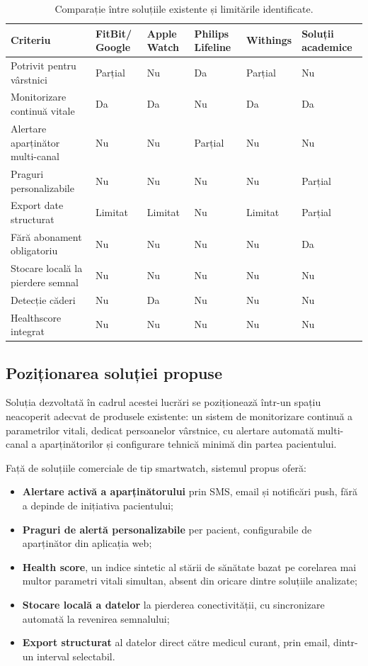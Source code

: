 \documentclass[12pt,a4paper]{article}
\begin{document}
\begin{table}[H]
\centering
\small
\renewcommand{\arraystretch}{1.3}
\begin{tabular}{|>{\raggedright\arraybackslash}p{3.0cm}|p{1.7cm}|p{1.7cm}|p{1.9cm}|p{1.5cm}|p{1.9cm}|}
\hline
\textbf{Criteriu} & \textbf{FitBit/ Google} & \textbf{Apple Watch} & \textbf{Philips Lifeline} & \textbf{Withings} & \textbf{Soluții academice}\\
\hline
Potrivit pentru vârstnici & Parțial & Nu & Da & Parțial & Nu\\
\hline
Monitorizare continuă vitale & Da & Da & Nu & Da & Da\\
\hline
Alertare aparținător multi-canal & Nu & Nu & Parțial & Nu & Nu\\
\hline
Praguri personalizabile & Nu & Nu & Nu & Nu & Parțial\\
\hline
Export date structurat & Limitat & Limitat & Nu & Limitat & Parțial\\
\hline
Fără abonament obligatoriu & Nu & Nu & Nu & Nu & Da\\
\hline
Stocare locală la pierdere semnal & Nu & Nu & Nu & Nu & Nu\\
\hline
Detecție căderi & Nu & Da & Nu & Nu & Nu\\
\hline
Healthscore integrat & Nu & Nu & Nu & Nu & Nu\\
\hline
\end{tabular}
\caption{Comparație între soluțiile existente și limitările identificate.}
\label{tab:comparatie}
\end{table}

\subsection{Poziționarea soluției propuse}

Soluția dezvoltată în cadrul acestei lucrări se poziționează într-un spațiu neacoperit adecvat de produsele existente: un sistem de monitorizare continuă a parametrilor vitali, dedicat persoanelor vârstnice, cu alertare automată multi-canal a aparținătorilor și configurare tehnică minimă din partea pacientului.

Față de soluțiile comerciale de tip smartwatch, sistemul propus oferă:

\begin{itemize}[leftmargin=1.5em]
\item \textbf{Alertare activă a aparținătorului} prin SMS, email și notificări push, fără a depinde de inițiativa pacientului;
\item \textbf{Praguri de alertă personalizabile} per pacient, configurabile de aparținător din aplicația web;
\item \textbf{Health score}, un indice sintetic al stării de sănătate bazat pe corelarea mai multor parametri vitali simultan, absent din oricare dintre soluțiile analizate;
\item \textbf{Stocare locală a datelor} la pierderea conectivității, cu sincronizare automată la revenirea semnalului;
\item \textbf{Export structurat} al datelor direct către medicul curant, prin email, dintr-un interval selectabil.
\end{itemize}
\end{document}
